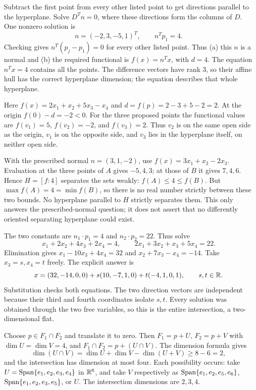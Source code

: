 Subtract the first point from every other listed point to get directions parallel to the hyperplane. Solve $D^Tn=0$, where these directions form the columns of $D$. One nonzero solution is
\[ n=(-2,3,-5,1)^T,\qquad n^Tp_1=4.\]
Checking gives $n^T(p_j-p_1)=0$ for every other listed point. Thus (a) this $n$ is a normal and (b) the required functional is $f(x)=n^Tx$, with $d=4$. The equation $n^Tx=4$ contains all the points. The difference vectors have rank 3, so their affine hull has the correct hyperplane dimension; the equation describes that whole hyperplane.

Here $f(x)=2x_1+x_2+5x_3-x_4$ and
$d=f(p)=2-3+5-2=2$. At the origin $f(0)-d=-2<0$.
For the three proposed points the functional values are
$f(v_1)=5$, $f(v_2)=-2$, and $f(v_3)=2$.
Thus $v_2$ is on the same open side as the origin, $v_1$ is on the
opposite side, and $v_3$ lies in the hyperplane itself, on neither open side.

With the prescribed normal $n=(3,1,-2)$, use $f(x)=3x_1+x_2-2x_3$.
Evaluation at the three points of $A$ gives $-5,4,3$; at those of $B$
it gives $7,4,6$. Hence $H=[f:4]$ separates the sets weakly:
$f(A)\le4\le f(B)$.
But $\max f(A)=4=\min f(B)$, so there is no real number strictly between
these two bounds. No hyperplane parallel to $H$ strictly separates them.
This only answers the prescribed-normal question; it does not assert that
no differently oriented separating hyperplane could exist.

The two constants are $n_1\cdot p_1=4$ and $n_2\cdot p_2=22$.
Thus solve
\[
 x_1+2x_2+4x_3+2x_4=4,\qquad
 2x_1+3x_2+x_3+5x_4=22.
\]
Elimination gives $x_1-10x_3+4x_4=32$ and $x_2+7x_3-x_4=-14$.
Take $x_3=s,x_4=t$ freely. The explicit answer is
\[
 x=(32,-14,0,0)+s(10,-7,1,0)+t(-4,1,0,1),\qquad s,t\in\mathbb{R}.
\]
Substitution checks both equations. The two direction vectors are
independent because their third and fourth coordinates isolate $s,t$.
Every solution was obtained through the two free variables, so this is the
entire intersection, a two-dimensional flat.

Choose $p\in F_1\cap F_2$ and translate it to zero. Then
$F_1=p+U$, $F_2=p+V$ with $\dim U=\dim V=4$, and
$F_1\cap F_2=p+(U\cap V)$.
The dimension formula gives
\[
 \dim(U\cap V)=\dim U+\dim V-\dim(U+V)\ge8-6=2,
\]
and the intersection has dimension at most four. Each possibility occurs:
take $U=\operatorname{Span}\{e_1,e_2,e_3,e_4\}$ in $\mathbb{R}^6$, and take $V$ respectively
as $\operatorname{Span}\{e_1,e_2,e_5,e_6\}$, $\operatorname{Span}\{e_1,e_2,e_3,e_5\}$, or $U$.
The intersection dimensions are $2,3,4$.

